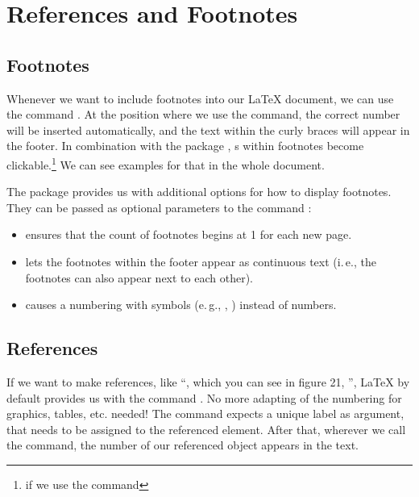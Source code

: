 \chapter{References and Footnotes}
\section{Footnotes}\label{sec:footnotes}


Whenever we want to include footnotes into our \LaTeX{} document, we can use 
the command . At the position where we use 
the command, the correct number will be inserted automatically, and the text 
within the curly braces will appear in the footer. In combination with the 
package , s within footnotes become 
clickable.\footnote{if we use the command }
We can see examples for that in the whole document.

The package  provides us with additional options for how to display footnotes. They can be passed as optional parameters to the command :
\begin{itemize}
  \item {} ensures that the count of footnotes begins at 1 for each new page.
  \item {} lets the footnotes within the footer appear as continuous text (i.\,e., the footnotes can also appear next to each other).
  \item {} causes a numbering with symbols (e.\,g.,  \textdagger, \textdaggerdbl) instead of numbers.
\end{itemize}


\section{References}\label{sec:references}

If we want to make references, like \enquote{\textellipsis , which you can see 
in figure 21, \textellipsis}, \LaTeX{} by default provides us with the command 
. No more adapting of the numbering 
for graphics, tables, etc. needed!
The command expects a unique label as argument, that needs to be assigned to 
the referenced element. After that, wherever we call the command, the number of 
our referenced object appears in the text.

